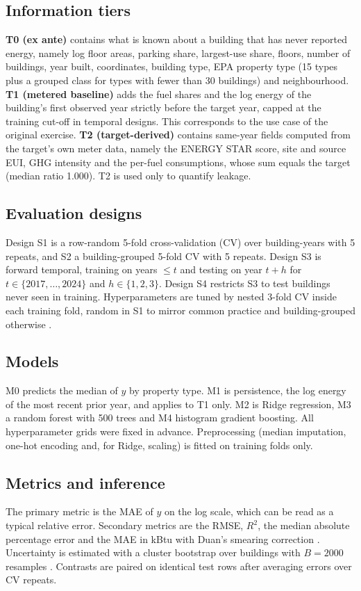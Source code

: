 \documentclass[11pt]{article}
\begin{document}
\subsection{Information tiers}
\textbf{T0 (ex ante)} contains what is known about a building that has never reported energy, namely log floor areas, parking share, largest-use share, floors, number of buildings, year built, coordinates, building type, EPA property type (15 types plus a grouped class for types with fewer than 30 buildings) and neighbourhood. \textbf{T1 (metered baseline)} adds the fuel shares and the log energy of the building's first observed year strictly before the target year, capped at the training cut-off in temporal designs. This corresponds to the use case of the original exercise. \textbf{T2 (target-derived)} contains same-year fields computed from the target's own meter data, namely the ENERGY STAR score, site and source EUI, GHG intensity and the per-fuel consumptions, whose sum equals the target (median ratio 1.000). T2 is used only to quantify leakage.

\subsection{Evaluation designs}
Design S1 is a row-random 5-fold cross-validation (CV) over building-years with 5 repeats, and S2 a building-grouped 5-fold CV with 5 repeats. Design S3 is forward temporal, training on years $\le t$ and testing on year $t+h$ for $t\in\{2017,\dots,2024\}$ and $h\in\{1,2,3\}$. Design S4 restricts S3 to test buildings never seen in training. Hyperparameters are tuned by nested 3-fold CV inside each training fold, random in S1 to mirror common practice and building-grouped otherwise \cite{varma2006bias}.

\subsection{Models}
M0 predicts the median of $y$ by property type. M1 is persistence, the log energy of the most recent prior year, and applies to T1 only. M2 is Ridge regression, M3 a random forest with 500 trees and M4 histogram gradient boosting. All hyperparameter grids were fixed in advance. Preprocessing (median imputation, one-hot encoding and, for Ridge, scaling) is fitted on training folds only.

\subsection{Metrics and inference}
The primary metric is the MAE of $y$ on the log scale, which can be read as a typical relative error. Secondary metrics are the RMSE, $R^2$, the median absolute percentage error and the MAE in kBtu with Duan's smearing correction \cite{duan1983smearing}. Uncertainty is estimated with a cluster bootstrap over buildings with $B=2000$ resamples \cite{field2007clustered}. Contrasts are paired on identical test rows after averaging errors over CV repeats.
\end{document}
